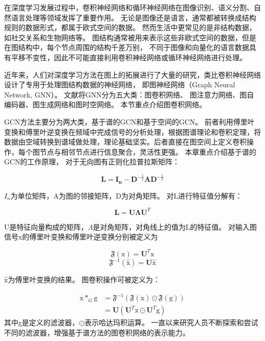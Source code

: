 在深度学习发展过程中，卷积神经网络和循环神经网络在图像识别、语义分割、自然语言处理等领域发挥了重要作用。
无论是图像还是语言，通常都被转换成结构规则的数据形式，都属于欧式空间的数据。
然而生活中更常见的是非结构数据，如社交关系和生物网络等。
图结构通常被用来表示这些非欧式空间的数据，但是在图结构中，每个节点周围的结构千差万别，
不同于图像和向量化的语言数据具有平移不变性，因此不可能直接利用卷积神经网络或循环神经网络进行处理。

近年来，人们对深度学习方法在图上的拓展进行了大量的研究，类比卷积神经网络设计了专用于处理图结构数据的神经网络，
即图神经网络（Graph  Neural  Network, GNN）。
文献\cite{2019A}将GNN分为五大类：图卷积网络、 图注意力网络、图自编码器、图生成网络和图时空网络。
本节重点介绍图卷积网络。

GCN方法主要分为两大类，基于谱的GCN和基于空间的GCN。
前者利用傅里叶变换和傅里叶逆变换在频域中完成信号的分析处理，根据图谱理论和卷积定理，将数据由空域转换到谱域做处理，理论基础坚实。后者直接在图空间上定义卷积操作，每个图节点与相邻节点进行信息聚合，灵活性更强。
本章重点介绍基于谱的GCN的工作原理，
对于无向图有正则化拉普拉斯矩阵：

\begin{equation}
\mathbf{L}=\mathbf{I}_{\mathbf{n}}-\mathbf{D}^{-\frac{1}{2}} \mathbf{A} \mathbf{D}^{-\frac{1}{2}}
\end{equation}

\noindent $I_n$为单位矩阵，A为图的邻接矩阵，D为对角矩阵。
对L进行特征值分解有：

\begin{equation}
\mathbf{L}=\mathbf{U} \mathbf{\Lambda} \mathbf{U}^{T}
\end{equation}

\noindent U是特征向量构成的矩阵，$\Lambda$是对角矩阵，对角线上的值为L的特征值。
对输入图信号x的傅里叶变换和傅里叶逆变换分别被定义为

\begin{equation}
\mathfrak{F}(\mathrm{x})=\mathbf{U}^{T} \mathrm{x} 
\end{equation}
\begin{equation}
\mathfrak{F}^{-1}(\hat{\mathrm{x}})=\mathbf{U} \hat{\mathrm{x}}
\end{equation}

\noindent $\hat{\mathrm{x}}$为傅里叶变换的结果。
图卷积操作可被定义为：

\begin{equation}
\begin{aligned}
\mathrm{x} *_{G} \mathrm{g} &=\mathfrak{F}^{-1}(\mathfrak{F}(\mathrm{x}) \odot \mathfrak{F}(\mathrm{g})) \\
&=\mathbf{U}\left(\mathbf{U}^{T} \mathrm{x} \odot \mathbf{U}^{T} \mathrm{g}\right)
\end{aligned}
\end{equation}
\noindent 其中g是定义的滤波器，$\odot$表示哈达玛积运算。
一直以来研究人员不断探索和尝试不同的滤波器，增强基于谱方法的图卷积网络的表示能力。





